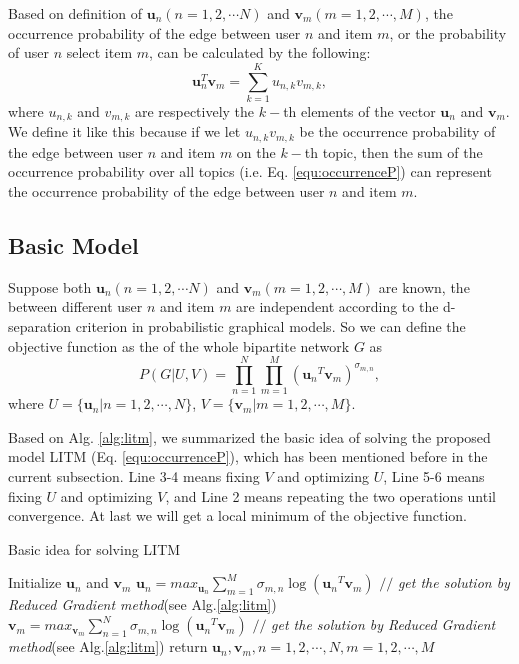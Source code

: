 \documentclass[conference]{IEEEtran}
\begin{document}
Based on definition of $\bm{u}_n (n=1,2,\cdots N)$ and $\bm{v}_m (m=1,2,\cdots,M)$, the occurrence probability of the edge between user $n$ and item $m$, or the probability of user $n$ select item $m$, can be calculated by the following:
\begin{equation}\label{equ:occurrenceP}
  \bm{u}_n^T\bm{v}_m = \sum_{k=1}^{K}u_{n,k}v_{m,k},
\end{equation}
where $u_{n,k}$ and $v_{m,k}$ are respectively the $k-$th elements of the vector $\bm{u}_n$ and $\bm{v}_m$. We define it like this because if we let $u_{n,k}v_{m,k}$ be the occurrence probability of the edge between user $n$ and item $m$ on the $k-$th topic, then the sum of the occurrence probability over all topics (i.e. Eq. \ref{equ:occurrenceP}) can represent the occurrence probability of the edge between user $n$ and item $m$.


\subsection{Basic Model}\label{sec:basemodel}
 Suppose both $\bm{u}_n (n=1,2,\cdots N)$ and $\bm{v}_m (m=1,2,\cdots,M)$ are known, the {\color{red}{occurrence of edges}} between different user $n$ and item $m$ are independent according to the d-separation criterion \cite{bishop2006pattern} in probabilistic graphical models. So we can define the objective function as the {\color{red}{occurrence probability}} of the whole bipartite network $G$ as
\begin{equation}
  P(G|U,V)=\prod_{n=1}^N\prod_{m=1}^{M}\left({\bm{u}_n}^T{\bm{v}_m}\right)^{\sigma_{m,n}},
\end{equation}
 where $U = \{\bm{u}_n|n=1,2,\cdots,N\}$, $V=\{\bm{v}_m|m=1,2,\cdots,M\}$.


Based on Alg. \ref{alg:litm}, we summarized the basic idea of solving the proposed model LITM (Eq. \ref{equ:occurrenceP}), which has been mentioned before in the current subsection. Line 3-4 means fixing $V$ and optimizing $U$, Line 5-6 means  fixing $U$ and optimizing $V$, and Line 2 means repeating the two operations until convergence. At last we will get a local minimum of the objective function.

\begin{algorithm}
    \caption{Basic idea for solving LITM}
    \label{alg:litm}
    Initialize $\bm{u}_n$ and $\bm{v}_m$\;
    {
      {
        $\bm{u}_n =max_{\bm{u}_n}\sum_{m=1}^{M}{\sigma_{m,n}}\log\left({\bm{u}_n}^T{\bm{v}_m}\right)$ $//$ \textit{get  the solution by Reduced Gradient method}(see Alg.\ref{alg:litm})\;
      }
      {
        $\bm{v}_m =max_{\bm{v}_m}\sum_{n=1}^{N}{\sigma_{m,n}}\log\left({\bm{u}_n}^T{\bm{v}_m}\right)$ $//$ \textit{get the solution by Reduced Gradient method}(see Alg.\ref{alg:litm})\;
      }
    }
    return $\bm{u}_n,\bm{v}_m,n=1,2,\cdots,N,m=1,2,\cdots,M$\;
\end{algorithm}
\end{document}

